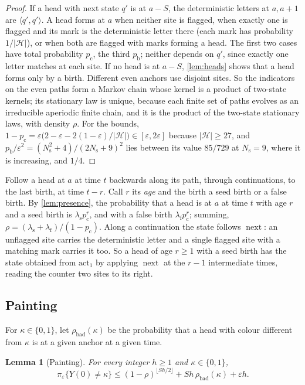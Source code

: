 \documentclass[11pt]{article}
\theoremstyle{plain}
\newtheorem{lemma}[theorem]{Lemma}
\theoremstyle{definition}
\theoremstyle{remark}
\newcommand{\eps}{\varepsilon}
\newcommand{\Lh}[1]{\langle #1}
\newcommand{\Rh}[1]{#1\rangle}
\newcommand{\act}{\mathrm{act}}
\newcommand{\nxt}{\operatorname{next}}
\newcommand{\Hs}{\mathcal H}
\begin{document}
\begin{proof}
If a head with next state $q'$ is at $a-S$, the deterministic letters at $a,a+1$ are $\Lh{q'},\Rh{q'}$. A head forms at $a$ when neither site is flagged, when exactly one is flagged and its mark is the deterministic letter there (each mark has probability $1/|\Hs|$), or when both are flagged with marks forming a head. The first two cases have total probability $p_{\mathrm c}$, the third $p_{\mathrm b}$; neither depends on $q'$, since exactly one letter matches at each site. If no head is at $a-S$, \cref{lem:heads} shows that a head forms only by a birth. Different even anchors use disjoint sites. So the indicators on the even paths form a Markov chain whose kernel is a product of two-state kernels; its stationary law is unique, because each finite set of paths evolves as an irreducible aperiodic finite chain, and it is the product of the two-state stationary laws, with density $\rho$. For the bounds, $1-p_{\mathrm c}=\eps\bigl(2-\eps-2(1-\eps)/|\Hs|\bigr)\in[\eps,2\eps]$ because $|\Hs|\ge27$, and $p_{\mathrm b}/\eps^2=(N_{\mathrm s}^2+4)/(2N_{\mathrm s}+9)^2$ lies between its value $85/729$ at $N_{\mathrm s}=9$, where it is increasing, and $1/4$.
\end{proof}

Follow a head at $a$ at time $t$ backwards along its path, through continuations, to the last birth, at time $t-r$. Call $r$ its \emph{age} and the birth a seed birth or a false birth. By \cref{lem:presence}, the probability that a head is at $a$ at time $t$ with age $r$ and a seed birth is $\lambda_{\mathrm s}p_{\mathrm c}^r$, and with a false birth $\lambda_{\mathrm f}p_{\mathrm c}^r$; summing, $\rho=(\lambda_{\mathrm s}+\lambda_{\mathrm f})/(1-p_{\mathrm c})$. Along a continuation the state follows $\nxt$: an unflagged site carries the deterministic letter and a single flagged site with a matching mark carries it too. So a head of age $r\ge1$ with a seed birth has the state obtained from $\act_1$ by applying $\nxt$ at the $r-1$ intermediate times, reading the counter two sites to its right.

\subsection{Painting}

For $\kappa\in\{0,1\}$, let $\rho_{\mathrm{bad}}(\kappa)$ be the probability that a head with colour different from $\kappa$ is at a given anchor at a given time.

\begin{lemma}[Painting]\label{lem:painting}
For every integer $h\ge1$ and $\kappa\in\{0,1\}$,
\[
\pi_\eps\{Y(0)\ne\kappa\}\le(1-\rho)^{\lfloor Sh/2\rfloor}+Sh\,\rho_{\mathrm{bad}}(\kappa)+\eps h .
\]
\end{lemma}
\end{document}
